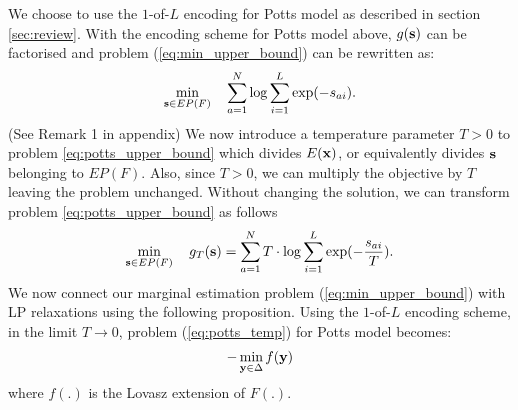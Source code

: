  We choose to use the $1$-of-$L$ encoding for Potts model as described in section \ref{sec:review}. With the encoding scheme for Potts model above, $g({\bf s})$ can be factorised and problem (\ref{eq:min_upper_bound}) can be rewritten as:
%
\begin{equation}
\min_{{\bf s} \in EP(F)} \quad \sum_{a = 1}^{N} \log \sum_{i = 1}^L \exp(-s_{ai}).
\label{eq:potts_upper_bound}
\end{equation}
(See Remark 1 in appendix)
 We now introduce
a temperature parameter $T > 0$ to problem \eqref{eq:potts_upper_bound} which
divides $E({\bf x})$, or equivalently divides $\bf s$ belonging to $EP(F)$. Also, since $T > 0$, we can multiply the objective by $T$ leaving the problem unchanged. Without changing the solution, we can transform problem \eqref{eq:potts_upper_bound} as follows
\begin{equation}
    \min_{{\bf s} \in EP(F)} \quad g_T ({\bf s}) = \sum_{a = 1}^{N} T \cdot \log \sum_{i = 1}^L \exp(-\frac{s_{ai}}{T}).
\label{eq:potts_temp}
\end{equation}
We now connect our marginal estimation problem (\ref{eq:min_upper_bound}) with
LP relaxations using the following proposition.
{\proposition Using the $1$-of-$L$ encoding scheme, in the limit $T \to 0$,
  problem (\ref{eq:potts_temp}) for Potts model becomes:
\begin{align}
    - \min_{{\bf y} \in \Delta} f({\bf y}) 
\end{align}
where $f(.)$ is the Lovasz extension of $F(.)$.
\label{proposition:potts_equiv}}

